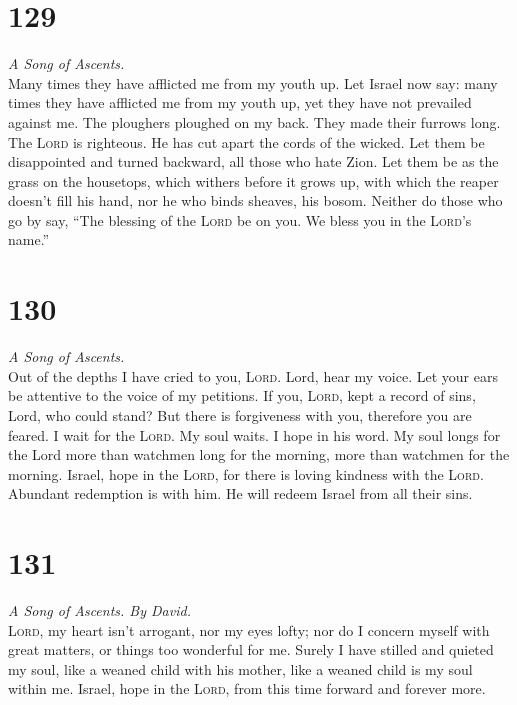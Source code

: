 \hypertarget{section-128}{%
\section{129}\label{section-128}}

\emph{A Song of Ascents.}\\
 Many times they have afflicted me from my youth up. Let
Israel now say:  many times they have afflicted me from my
youth up, yet they have not prevailed against me.  The
ploughers ploughed on my back. They made their furrows long.
 The \textsc{Lord} is righteous. He has cut apart the
cords of the wicked.  Let them be disappointed and turned
backward, all those who hate Zion.  Let them be as the
grass on the housetops, which withers before it grows up, 
with which the reaper doesn't fill his hand, nor he who binds sheaves,
his bosom.  Neither do those who go by say, ``The blessing
of the \textsc{Lord} be on you. We bless you in the \textsc{Lord}'s
name.''

\hypertarget{section-129}{%
\section{130}\label{section-129}}

\emph{A Song of Ascents.}\\
 Out of the depths I have cried to you, \textsc{Lord}.
 Lord, hear my voice. Let your ears be attentive to the
voice of my petitions.  If you, \textsc{Lord}, kept a
record of sins, Lord, who could stand?  But there is
forgiveness with you, therefore you are feared.  I wait
for the \textsc{Lord}. My soul waits. I hope in his word. 
My soul longs for the Lord more than watchmen long for the morning, more
than watchmen for the morning.  Israel, hope in the
\textsc{Lord}, for there is loving kindness with the \textsc{Lord}.
Abundant redemption is with him.  He will redeem Israel
from all their sins.

\hypertarget{section-130}{%
\section{131}\label{section-130}}

\emph{A Song of Ascents. By David.}\\
 \textsc{Lord}, my heart isn't arrogant, nor my eyes
lofty; nor do I concern myself with great matters, or things too
wonderful for me.  Surely I have stilled and quieted my
soul, like a weaned child with his mother, like a weaned child is my
soul within me.  Israel, hope in the \textsc{Lord}, from
this time forward and forever more.


